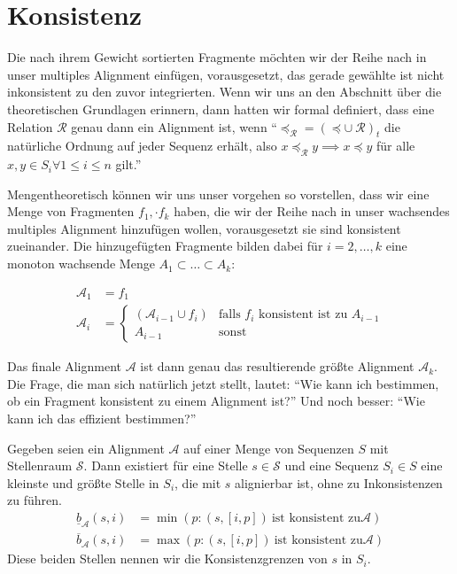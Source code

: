 \section{Konsistenz}

Die nach ihrem Gewicht sortierten Fragmente möchten wir der Reihe nach in unser multiples Alignment einfügen, vorausgesetzt, das gerade gewählte ist nicht inkonsistent zu den zuvor integrierten. Wenn wir uns an den Abschnitt über die theoretischen Grundlagen erinnern, dann hatten wir formal definiert, dass eine Relation $\mathcal{R}$ genau dann ein Alignment ist, wenn \enquote{$\preceq_{\mathcal{R}}=(\preceq \cup\: \mathcal{R})_t$ die natürliche Ordnung auf jeder Sequenz erhält, also $x \preceq_{\mathcal{R}} y \implies x \preceq y$ für alle $x,y \in S_i \forall 1\leq i \leq n$ gilt.}

Mengentheoretisch können wir uns unser vorgehen so vorstellen, dass wir eine Menge von Fragmenten $f_1, \cdot f_k$ haben, die wir der Reihe nach in unser wachsendes multiples Alignment hinzufügen wollen, vorausgesetzt sie sind konsistent zueinander. Die hinzugefügten Fragmente bilden dabei für $i = 2, \dots, k$ eine monoton wachsende Menge $A_1 \subset \dots \subset A_k$:

\begin{equation}
\begin{split}
	\mathcal{A}_1 &= f_1 \\
	\mathcal{A}_i &= 
		\begin{cases}
			(\mathcal{A}_{i-1} \cup f_i) & \text{falls $f_i$ konsistent ist zu $A_{i-1}$} \\
			A_{i-1} & \text{sonst} 
		\end{cases}
\end{split}
\end{equation} 

Das finale Alignment $\mathcal{A}$ ist dann genau das resultierende größte Alignment $\mathcal{A}_k$. Die Frage, die man sich natürlich jetzt stellt, lautet: \enquote{Wie kann ich bestimmen, ob ein Fragment konsistent zu einem Alignment ist?} Und noch besser: \enquote{Wie kann ich das effizient bestimmen?}

\begin{definition}[Konsistenzgrenze]
	Gegeben seien ein Alignment $\mathcal{A}$ auf einer Menge von Sequenzen $S$ mit Stellenraum $\mathcal{S}$. Dann existiert für eine Stelle $s \in \mathcal{S}$ und eine Sequenz $S_i \in S$ eine kleinste und größte Stelle in $S_i$, die mit $s$ alignierbar ist, ohne zu Inkonsistenzen zu führen.
	\begin{equation}
	\begin{split}
	\underline{b}_\mathcal{A}(s,i) &= \min(p: (s,[i,p])\: \text{ist konsistent zu} \mathcal{A}) \\
	\overline{b}_\mathcal{A}(s,i) &= \max(p: (s,[i,p])\: \text{ist konsistent zu} \mathcal{A})
	\end{split} 
	\end{equation}
	Diese beiden Stellen nennen wir die Konsistenzgrenzen von $s$ in $S_i$. 
\end{definition}

